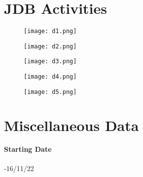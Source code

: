 \documentclass[]{article}
\begin{document}
    \pagebreak
 \thispagestyle{restpage}
  \section*{JDB Activities}
   \vspace*{10mm}
 \begin{figure}[h]
      \begin{center}
      \texttt{[image: d1.png]}
      \end{center}
      \end{figure}
      \vspace*{10mm}
       \begin{figure}[h]
      \begin{center}
      \texttt{[image: d2.png]}
      \end{center}
      \end{figure}
    \pagebreak
 \thispagestyle{restpage}  
      

 \begin{figure}[h]
      \begin{center}
      \texttt{[image: d3.png]}
      \end{center}
      \end{figure}
   \begin{figure}[h]
      \begin{center}
      \texttt{[image: d4.png]}
      \end{center}
      \end{figure}
     \pagebreak
 \thispagestyle{restpage} 
     \begin{figure}[h]
      \begin{center}
      \texttt{[image: d5.png]}
      \end{center}
      \end{figure}
       
      \pagebreak
 \thispagestyle{restpage}
  
\section*{Miscellaneous Data}
\vspace*{10mm}
\paragraph{Starting Date}-\large 16/11/22
\\
\end{document}
